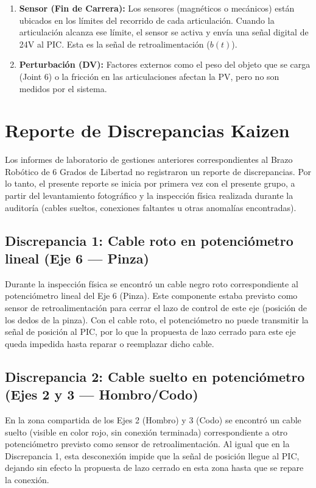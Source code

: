 \documentclass[11pt]{article}
\begin{document}
\begin{enumerate}
	\item \textbf{Sensor (Fin de Carrera):} Los sensores (magnéticos o mecánicos) están ubicados en los límites del recorrido de cada articulación. Cuando la articulación alcanza ese límite, el sensor se activa y envía una señal digital de 24V al PIC. Esta es la señal de retroalimentación ($b(t)$).
	
	\item \textbf{Perturbación (DV):} Factores externos como el peso del objeto que se carga (Joint 6) o la fricción en las articulaciones afectan la PV, pero no son medidos por el sistema.
\end{enumerate}

\section{Reporte de Discrepancias Kaizen}

Los informes de laboratorio de gestiones anteriores correspondientes al Brazo Robótico de 6 Grados de Libertad no registraron un reporte de discrepancias. Por lo tanto, el presente reporte se inicia por primera vez con el presente grupo, a partir del levantamiento fotográfico y la inspección física realizada durante la auditoría (cables sueltos, conexiones faltantes u otras anomalías encontradas).

\subsection{Discrepancia 1: Cable roto en potenciómetro lineal (Eje 6 — Pinza)}



Durante la inspección física se encontró un cable negro roto correspondiente al potenciómetro lineal del Eje 6 (Pinza). Este componente estaba previsto como sensor de retroalimentación para cerrar el lazo de control de este eje (posición de los dedos de la pinza). Con el cable roto, el potenciómetro no puede transmitir la señal de posición al PIC, por lo que la propuesta de lazo cerrado para este eje queda impedida hasta reparar o reemplazar dicho cable.

\subsection{Discrepancia 2: Cable suelto en potenciómetro (Ejes 2 y 3 — Hombro/Codo)}



En la zona compartida de los Ejes 2 (Hombro) y 3 (Codo) se encontró un cable suelto (visible en color rojo, sin conexión terminada) correspondiente a otro potenciómetro previsto como sensor de retroalimentación. Al igual que en la Discrepancia 1, esta desconexión impide que la señal de posición llegue al PIC, dejando sin efecto la propuesta de lazo cerrado en esta zona hasta que se repare la conexión.
\end{document}
